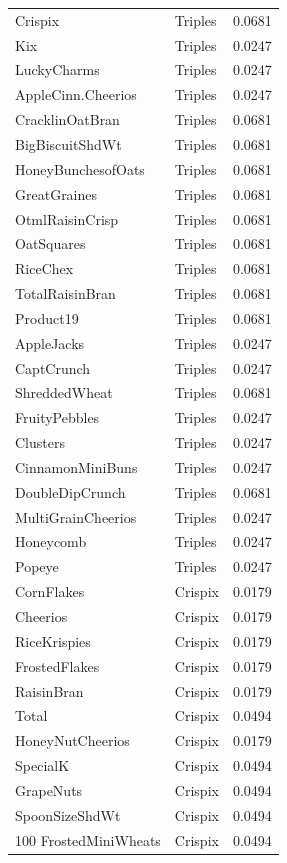 \begin{longtable}{llr}
Crispix & Triples & 0.0681 \\
Kix & Triples & 0.0247 \\
LuckyCharms & Triples & 0.0247 \\
AppleCinn.Cheerios & Triples & 0.0247 \\
CracklinOatBran & Triples & 0.0681 \\
BigBiscuitShdWt & Triples & 0.0681 \\
HoneyBunchesofOats & Triples & 0.0681 \\
GreatGraines & Triples & 0.0681 \\
OtmlRaisinCrisp & Triples & 0.0681 \\
OatSquares & Triples & 0.0681 \\
RiceChex & Triples & 0.0681 \\
TotalRaisinBran & Triples & 0.0681 \\
Product19 & Triples & 0.0681 \\
AppleJacks & Triples & 0.0247 \\
CaptCrunch & Triples & 0.0247 \\
ShreddedWheat & Triples & 0.0681 \\
FruityPebbles & Triples & 0.0247 \\
Clusters & Triples & 0.0247 \\
CinnamonMiniBuns & Triples & 0.0247 \\
DoubleDipCrunch & Triples & 0.0681 \\
MultiGrainCheerios & Triples & 0.0247 \\
Honeycomb & Triples & 0.0247 \\
Popeye & Triples & 0.0247 \\
CornFlakes & Crispix & 0.0179 \\
Cheerios & Crispix & 0.0179 \\
RiceKrispies & Crispix & 0.0179 \\
FrostedFlakes & Crispix & 0.0179 \\
RaisinBran & Crispix & 0.0179 \\
Total & Crispix & 0.0494 \\
HoneyNutCheerios & Crispix & 0.0179 \\
SpecialK & Crispix & 0.0494 \\
GrapeNuts & Crispix & 0.0494 \\
SpoonSizeShdWt & Crispix & 0.0494 \\
100%
FrostedMiniWheats & Crispix & 0.0494 \\

\end{longtable}
